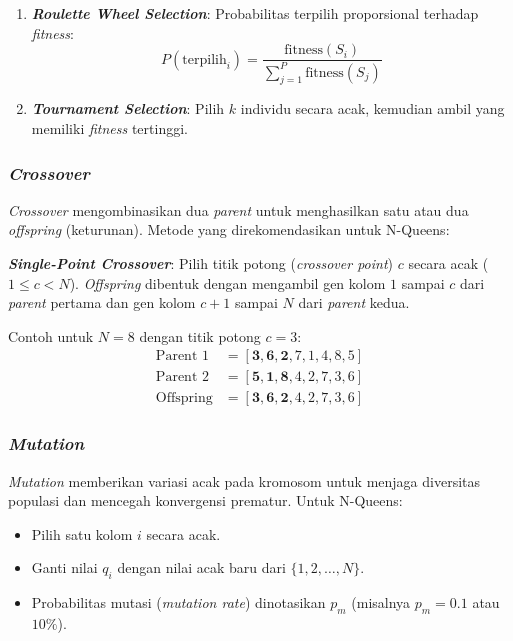 \documentclass[12pt,a4paper]{article}
\begin{document}
\begin{enumerate}[label=\arabic*.]
    \item \textbf{\textit{Roulette Wheel Selection}}: Probabilitas terpilih proporsional terhadap \textit{fitness}:
    \[
        P(\text{terpilih}_i) = \frac{\text{fitness}(S_i)}{\sum_{j=1}^{P} \text{fitness}(S_j)}
    \]
    \item \textbf{\textit{Tournament Selection}}: Pilih $k$ individu secara acak, kemudian ambil yang memiliki \textit{fitness} tertinggi.
\end{enumerate}

\subsubsection{\textit{Crossover}}
\label{subsubsec:crossover}

\textit{Crossover} mengombinasikan dua \textit{parent} untuk menghasilkan satu atau dua \textit{offspring} (keturunan). Metode yang direkomendasikan untuk N-Queens:

\textbf{\textit{Single-Point Crossover}}: Pilih titik potong (\textit{crossover point}) $c$ secara acak ($1 \leq c < N$). \textit{Offspring} dibentuk dengan mengambil gen kolom $1$ sampai $c$ dari \textit{parent} pertama dan gen kolom $c+1$ sampai $N$ dari \textit{parent} kedua.

Contoh untuk $N = 8$ dengan titik potong $c = 3$:
\begin{align*}
    \text{Parent 1} &= [\mathbf{3, 6, 2}, 7, 1, 4, 8, 5] \\
    \text{Parent 2} &= [\mathbf{5, 1, 8}, 4, 2, 7, 3, 6] \\
    \text{Offspring} &= [\mathbf{3, 6, 2}, 4, 2, 7, 3, 6]
\end{align*}

\subsubsection{\textit{Mutation}}
\label{subsubsec:mutation}

\textit{Mutation} memberikan variasi acak pada kromosom untuk menjaga diversitas populasi dan mencegah konvergensi prematur. Untuk N-Queens:

\begin{itemize}
    \item Pilih satu kolom $i$ secara acak.
    \item Ganti nilai $q_i$ dengan nilai acak baru dari $\{1, 2, \ldots, N\}$.
    \item Probabilitas mutasi (\textit{mutation rate}) dinotasikan $p_m$ (misalnya $p_m = 0.1$ atau $10\%$).
\end{itemize}
\end{document}
